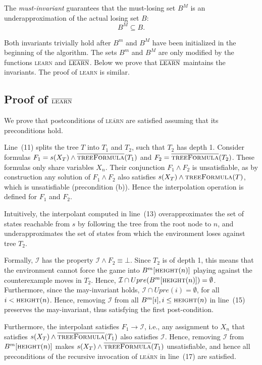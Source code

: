 \documentclass{llncs}
\newcommand{\II}{\mathcal{I}}
\newcommand{\textoverline}[1]{$\overline{\mbox{#1}}$}
\begin{document}
The \emph{must-invariant} guarantees that the must-losing set $B^M$ is an
underapproximation of the actual losing set $B$: $$B^M \subseteq B.$$

Both invariants trivially hold after $B^m$ and $B^M$ have been initialized in the
beginning of the algorithm.
The sets $B^m$ and $B^M$ are only modified by the functions \textsc{learn} and
\textoverline{\textsc{learn}}.  Below we prove that \textoverline{\textsc{learn}} 
maintains the invariants.  The proof of \textsc{learn} is similar.

\subsection{Proof of \textoverline{\textsc{learn}}}

We prove that postconditions of \textsc{\textoverline{learn}} are satisfied
assuming that its preconditions hold.

Line~(11) splits the tree $T$ into $T_1$ and $T_2$, such that $T_2$ has depth
1.  Consider formulas $F_1=s(X_T) \land
\textsc{\textoverline{treeFormula}}(T_1)$ and $F_2 =
\textsc{\textoverline{treeFormula}}(T_2)$.  These formulas only share variables
$X_n$.  Their conjunction $F_1 \land F_2$ is unsatisfiable, as by construction
any solution of $F_1 \land F_2$ also satisfies $s(X_T) \land
\textsc{treeFormula}(T)$, which is unsatisfiable (precondition (b)).  Hence the
interpolation operation is defined for $F_1$ and $F_2$.  

Intuitively, the interpolant computed in line~(13) overapproximates the set of
states reachable from $s$ by following the tree from the root node to $n$,
and underapproximates the set of states from which the environment loses
against tree $T_2$.  

Formally, $\II$ has the property $\II \land F_2 \equiv \bot$.  Since $T_2$ is
of depth 1, this means that the environment cannot force the game into
$B^m[\textsc{height}(n)]$ playing against the counterexample moves in $T_2$.
Hence, $\II \cap Upre(B^m[\textsc{height}(n)]) = \emptyset$.  Furthermore, since
the may-invariant holds, $\II \cap Upre(i) = \emptyset$, for all $i <
\textsc{height}(n)$.  Hence, removing $\II$ from all $B^m[i], i\leq
\textsc{height}(n)$ in line~(15) preserves the may-invariant, thus satisfying the
first post-condition.

Furthermore, the interpolant satisfies $F_1 \rightarrow \II$, i.e., any
assignment to $X_n$ that satisfies $s(X_T) \land
\textsc{\textoverline{treeFormula}}(T_1)$ also satisfies $\II$.  Hence,
removing $\II$ from $B^m[\textsc{height}(n)]$ makes $s(X_T) \land
\textsc{\textoverline{treeFormula}}(T_1)$ unsatisfiable, and hence all
preconditions of the recursive invocation of \textsc{\textoverline{learn}} in
line~(17) are satisfied.  
\end{document}
